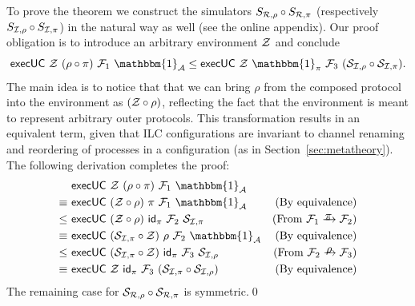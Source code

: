 \noindent \proof To prove the theorem we construct the simulators
$S_{\mathcal{{R}},\rho} \circ S_{\mathcal{{R}},\pi}$ (respectively $S_{\mathcal{{I}},\rho} \circ
S_{\mathcal{{I,\pi}}}$) in the natural way as well (see the online appendix).
Our proof obligation is to introduce an arbitrary environment $\mathcal{{Z}}$ and conclude
\[  \keyword{execUC}~\mc{Z} ~(\rho \circ \pi)~\mc{F}_1 ~\mathbbm{1}_\mc{A}
\le \keyword{execUC}~\mc{Z} ~\mathbbm{1}_\mc{\pi} ~\mc{F}_3 ~(\mc{S}_{\mc{I},\rho} \circ \mc{S}_{\mc{I},\pi})
.\]
\noindent
%
The main idea is to notice that that we can bring $\rho$ from the composed protocol into the environment as $(\mathcal{{Z}}\circ \rho)$, reflecting the fact that the environment is meant to represent arbitrary outer protocols. This transformation results in an equivalent term, given that ILC configurations are invariant to channel renaming and reordering of processes in a configuration (as in Section~\ref{sec:metatheory}).
The following derivation completes the proof:
\begin{align*}
    &~ \keyword{execUC}~\mc{Z}~(\rho \circ \pi)~\mc{F}_1~ \mathbbm{1}_\mc{A} & \\
  \equiv &~ \keyword{execUC}~(\mc{Z}\circ \rho)~\pi~\mc{F}_1~ \mathbbm{1}_\mc{A} &
  \textnormal{(By equivalence)} \\
\le&~ \keyword{execUC}~(\mc{Z}\circ \rho)~\mathsf{id}_\pi ~\mc{F}_2~ \mc{S}_{\mc{I},\pi} & (\textnormal{From}~ \mc{F}_1 \yrightarrow{$\pi$} \mc{F}_2) \\
 \equiv &~ \keyword{execUC}~(\mc{S}_{\mc{I},\pi}\circ \mc{Z})~\rho ~\mc{F}_2~ \mathbbm{1}_\mc{A} &  \textnormal{(By equivalence)} \\
\le&~ \keyword{execUC}~(\mc{S}_{\mc{I},\pi}\circ\mc{Z})~\mathsf{id}_\pi~\mc{F}_3~\mc{S}_{\mc{I},\rho} &
(\textnormal{From}~ \mc{F}_2 \yrightarrow{$\rho$} \mc{F}_3) \\
\equiv &~ \keyword{execUC}~\mc{Z}~ \mathsf{id}_\pi~ \mc{F}_3~ (\mc{S}_{\mc{I},\pi} \circ \mc{S}_{\mc{I},\rho}) &
\textnormal{(By equivalence)}
\end{align*}
The remaining case for $\mathcal{{S}}_{\mathcal{{R}},\rho} \circ \mathcal{{S}}_{\mathcal{{R}},\pi}$ is symmetric.\qed
